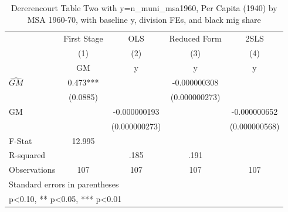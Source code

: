 \begin{table}[htbp]\centering
\def\sym#1{\ifmmode^{#1}\else\(^{#1}\)\fi}
\caption{Dererencourt Table Two with y=n\_muni\_msa1960, Per Capita (1940) by MSA 1960-70, with baseline y, division FEs, and black mig share}
\begin{tabular}{l*{4}{c}}
\toprule
                    & First Stage   &         OLS   &Reduced Form   &        2SLS   \\
                    &\multicolumn{1}{c}{(1)}&\multicolumn{1}{c}{(2)}&\multicolumn{1}{c}{(3)}&\multicolumn{1}{c}{(4)}\\
                    &\multicolumn{1}{c}{GM}&\multicolumn{1}{c}{y}&\multicolumn{1}{c}{y}&\multicolumn{1}{c}{y}\\
\midrule
$\hat{GM}$          &       0.473***&               &-0.000000308   &               \\
                    &    (0.0885)   &               &(0.000000273)   &               \\
\addlinespace
GM                  &               &-0.000000193   &               &-0.000000652   \\
                    &               &(0.000000273)   &               &(0.000000568)   \\
\midrule
F-Stat              &      12.995   &               &               &               \\
R-squared           &               &        .185   &        .191   &               \\
Observations        &         107   &         107   &         107   &         107   \\
\bottomrule
\multicolumn{5}{l}{\footnotesize Standard errors in parentheses}\\
\multicolumn{5}{l}{\footnotesize * p<0.10, ** p<0.05, *** p<0.01}\\
\end{tabular}
\end{table}
